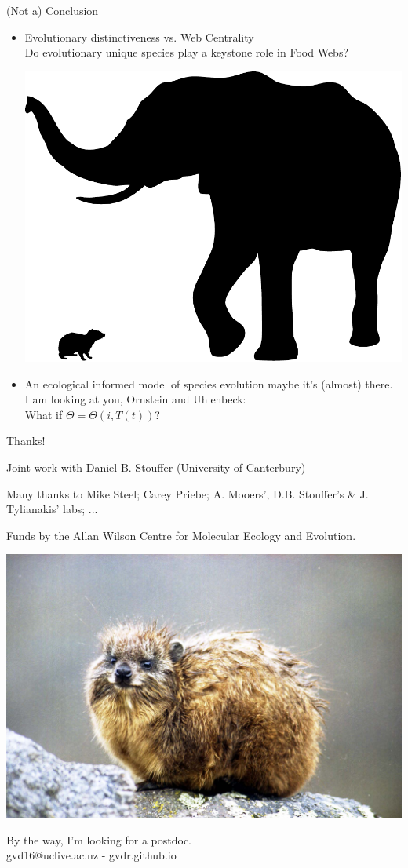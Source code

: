 \documentclass[]{beamer}
\begin{document}
\begin{frame}{(Not a) Conclusion}

\begin{itemize}[<+->]
\item
  Evolutionary distinctiveness vs. Web Centrality\\
  {\small Do evolutionary unique species play a keystone role in Food Webs?}
  \vspace{3 mm}
  
\centering
  \includegraphics[width=0.4\linewidth]{images/hyraxElephant.pdf}
  
  \vspace{3 mm}

\item
  An ecological informed model of species evolution maybe
  it's (almost) there.\\
  {\small I am looking at you, Ornstein and Uhlenbeck:\\
  What if $\Theta = \Theta(i,T(t))$?}
\end{itemize}

\end{frame}

\begin{frame}{Thanks!}

\begin{centering}
\small{
Joint work with  
Daniel B. Stouffer (University of Canterbury)

Many thanks to  
Mike Steel; Carey Priebe; A. Mooers', D.B. Stouffer's \& J. Tylianakis' labs; ...

Funds by the Allan Wilson Centre for Molecular Ecology and Evolution.}

\centering
  \includegraphics[width=0.4\linewidth]{images/hyrax.jpg}

\small{By the way, I'm looking for a postdoc.\\ gvd16@uclive.ac.nz - gvdr.github.io}

\end{centering}

\end{frame}
\end{document}
